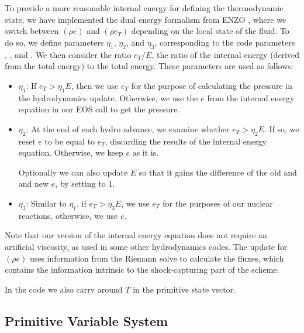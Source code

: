 To provide a more reasonable internal energy for defining the
thermodynamic state, we have implemented the dual energy formalism
from ENZO \cite{bryan:1995,bryan:2014}, where we switch between $(\rho
e)$ and $(\rho e_T)$ depending on the local state of the fluid. To do
so, we define parameters $\eta_1$, $\eta_2$, and $\eta_3$,
corresponding to the code parameters
,
, and
. We then consider the ratio $e_T
/ E$, the ratio of the internal energy (derived from the total energy)
to the total energy.  These parameters are used as follows:
\begin{itemize}
\item $\eta_1$: If $e_T > \eta_1 E$, then we use $e_T$ for the purpose
  of calculating the pressure in the hydrodynamics update. Otherwise,
  we use the $e$ from the internal energy equation in our EOS call to
  get the pressure. 

\item $\eta_2$: At the end of each hydro advance, we examine whether
  $e_T > \eta_2 E$. If so, we reset $e$ to be equal to $e_T$,
  discarding the results of the internal energy equation. Otherwise,
  we keep $e$ as it is. 

  Optionally we can also update $E$ so that it gains the difference of
  the old and and new $e$, by setting
   to 1.

\item $\eta_3$: Similar to $\eta_1$, if $e_T > \eta_3 E$, we use
  $e_T$ for the purposes of our nuclear reactions, otherwise, we use
  $e$.

\end{itemize}

Note that our version of the internal energy equation does not require
an artificial viscosity, as used in some other hydrodynamics
codes. The update for $(\rho e)$ uses information from the Riemann
solve to calculate the fluxes, which contains the information
intrinsic to the shock-capturing part of the scheme.


In the code we also carry around $T$ in the primitive state vector.


\subsection{Primitive Variable System}

